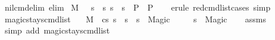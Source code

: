 \begin{isabellebody}
\endisatagproof
{\isafoldproof}%
%
\isadelimproof
\isanewline
%
\endisadelimproof
\isanewline
\isanewline
{}\isamarkupfalse%
\ nil{\isacharunderscore}{\kern0pt}cmd{\isacharunderscore}{\kern0pt}elim\ {\isacharbrackleft}{\kern0pt}elim{\isacharbang}{\kern0pt}{\isacharbrackright}{\kern0pt}{\isacharcolon}{\kern0pt}\isanewline
\ {\isachardoublequoteopen}{\isasymlbrakk}M{\isacharcomma}{\kern0pt}{\isasymLambda}{\isacharcomma}{\kern0pt}{\isasymGamma}{\isacharcomma}{\kern0pt}{\isasymDelta}\ {\isasymturnstile}\ {\isasymlangle}{\isacharbrackleft}{\kern0pt}{\isacharbrackright}{\kern0pt}{\isacharcomma}{\kern0pt}\ s{\isasymrangle}\ {\isacharbrackleft}{\kern0pt}{\isasymrightarrow}{\isacharbrackright}{\kern0pt}\ s{\isacharprime}{\kern0pt}{\isacharsemicolon}{\kern0pt}\ s{\isacharprime}{\kern0pt}\ {\isacharequal}{\kern0pt}\ s\ {\isasymLongrightarrow}\ P{\isasymrbrakk}\ {\isasymLongrightarrow}\ P{\isachardoublequoteclose}\isanewline
%
\isadelimproof
\ \ %
\endisadelimproof
%
\isatagproof
{}\isamarkupfalse%
\ {\isacharparenleft}{\kern0pt}erule\ red{\isacharunderscore}{\kern0pt}cmd{\isacharunderscore}{\kern0pt}list{\isachardot}{\kern0pt}cases{\isacharsemicolon}{\kern0pt}\ simp{\isacharparenright}{\kern0pt}%
\endisatagproof
{\isafoldproof}%
%
\isadelimproof
\isanewline
%
\endisadelimproof
\isanewline
{}\isamarkupfalse%
\ magic{\isacharunderscore}{\kern0pt}stays{\isacharunderscore}{\kern0pt}cmd{\isacharunderscore}{\kern0pt}list{\isacharunderscore}{\kern0pt}{}{\isacharcolon}{\kern0pt}\isanewline
\ \ \ {\isachardoublequoteopen}M{\isacharcomma}{\kern0pt}{\isasymLambda}{\isacharcomma}{\kern0pt}{\isasymGamma}{\isacharcomma}{\kern0pt}{\isasymDelta}\ {\isasymturnstile}\ {\isasymlangle}cs{\isacharcomma}{\kern0pt}\ s{\isasymrangle}\ {\isacharbrackleft}{\kern0pt}{\isasymrightarrow}{\isacharbrackright}{\kern0pt}\ s{\isacharprime}{\kern0pt}{\isachardoublequoteclose}\ \ {\isachardoublequoteopen}s\ {\isacharequal}{\kern0pt}\ Magic{\isachardoublequoteclose}\isanewline
\ \ \ \ \ {\isachardoublequoteopen}s{\isacharprime}{\kern0pt}\ {\isacharequal}{\kern0pt}\ Magic{\isachardoublequoteclose}\isanewline
%
\isadelimproof
\ \ %
\endisadelimproof
%
\isatagproof
{}\isamarkupfalse%
\ assms\isanewline
\ \ \isamarkupfalse%
\ {\isacharparenleft}{\kern0pt}simp\ add{\isacharcolon}{\kern0pt}\ magic{\isacharunderscore}{\kern0pt}stays{\isacharunderscore}{\kern0pt}cmd{\isacharunderscore}{\kern0pt}list{\isacharparenright}{\kern0pt}%
\endisatagproof

\end{isabellebody}
